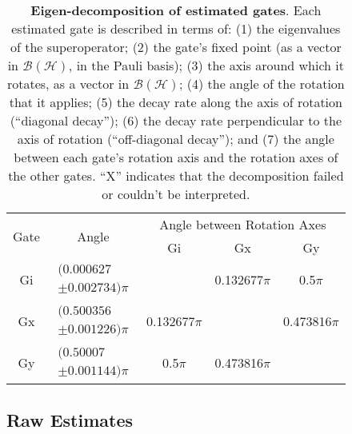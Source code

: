\documentclass{article}[11pt]
\begin{document}
\begin{table}[h]
\begin{center}
\vspace{2em}
\begin{tabular}[l]{|c|c|c|c|c|}
\hline
\multirow{2}{*}{Gate} & \multirow{2}{*}{Angle} & \multicolumn{3}{c|}{Angle between Rotation Axes} \\ \cline{3-5}
 & & Gi & Gx & Gy \\ \hline
Gi & $ \begin{array}{c}(0.000627 \\ \pm 0.002734)\pi \end{array} $ &  & 0.132677$\pi$ & 0.5$\pi$ \\ \hline
Gx & $ \begin{array}{c}(0.500356 \\ \pm 0.001226)\pi \end{array} $ & 0.132677$\pi$ &  & 0.473816$\pi$ \\ \hline
Gy & $ \begin{array}{c}(0.50007 \\ \pm 0.001144)\pi \end{array} $ & 0.5$\pi$ & 0.473816$\pi$ &  \\ \hline
\end{tabular}

\caption{\textbf{Eigen-decomposition of estimated gates}.  Each estimated gate is described in terms of: (1) the eigenvalues of the superoperator; (2) the gate's fixed point (as a vector in $\mathcal{B}(\mathcal{H})$, in the Pauli basis); (3)  the axis around which it rotates, as a vector in $\mathcal{B}(\mathcal{H})$; (4) the angle of the rotation that it applies; (5) the decay rate along the axis of rotation (``diagonal decay''); (6) the decay rate perpendicular to the axis of rotation (``off-diagonal decay''); and (7) the angle between each gate's rotation axis and the rotation axes of the other gates.  ``X'' indicates that the decomposition failed or couldn't be interpreted. \label{bestGatesetDecompTable}}
\end{center}
\end{table}

\FloatBarrier

\subsection{Raw Estimates}
\end{document}
